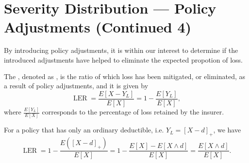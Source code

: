\documentclass[notoc,notitlepage]{tufte-book}
\DeclareMathOperator{\LER}{LER }
\begin{document}
\section{Severity Distribution --- Policy Adjustments (Continued 4)}%
\label{sec:severity_distribution_policy_adjustments_continued_4}

By introducing policy adjustments, it is within our interest to determine if the introduced adjustments have helped to eliminate the expected propotion of loss.

\begin{defn}\label{defn:loss_elimination_ratio}
  The , denoted as \hldefn{$\LER$}, is the ratio of which loss has been mitigated, or eliminated, as a result of policy adjustments, and it is given by
  \begin{equation*}
    \LER = \frac{E[ X - Y_L ]}{E[X]} = 1 - \frac{E[Y_L]}{E[X]},
  \end{equation*}
  where $\frac{E[Y_L]}{E[X]}$ corresponds to the percentage of loss retained by the insurer.
\end{defn}

\begin{eg}
  For a policy that has only an ordinary deductible, i.e. $Y_L = {[X - d]}_+$, we have
  \begin{equation*}
    \LER = 1 - \frac{E( {[X - d]}_+ )}{E[X]} = 1 - \frac{E[X] - E[X \land d]}{E[X]} = \frac{E[X \land d]}{E[X]}.
  \end{equation*}
\end{eg}
\end{document}
